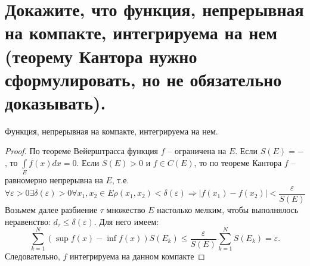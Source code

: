 \section{Докажите, что функция, непрерывная на компакте, интегрируема на нем (теорему Кантора нужно сформулировать, но не обязательно доказывать).}

\begin{theorem}
    Функция, непрерывная на компакте, интегрируема на нем.
    \begin{proof}
        По теореме Вейерштрасса функция $f$ -- ограничена на $E$. Если $S(E) = -$, то $\int \limits_E f(x) dx = 0$. Если $S(E) > 0$ и $f \in C(E)$, то по теореме Кантора $f$ -- равномерно непрерывна на $E$, т.е.
        \[
            \forall \varepsilon > 0
            \exists \delta(\varepsilon) > 0
            \forall x_1, x_2 \in E
            \rho(x_1, x_2) < \delta(\varepsilon)
            \Rightarrow
            |f(x_1) - f(x_2)| < \frac{\varepsilon}{S(E)}
        \]
        Возьмем далее разбиение $\tau$ множество $E$ настолько мелким, чтобы выполнялось неравенство: $d_{\tau} \leqslant \delta(\varepsilon)$. Для него имеем:
        \[
            \sum_{k=1}^N (\sup f(x) - \inf f(x)) S(E_k) \leqslant \frac{\varepsilon}{S(E)} \sum_{k=1}^N S(E_k) = \varepsilon.
        \]
        Следовательно, $f$ интегрируема на данном компакте
    \end{proof}
\end{theorem}
